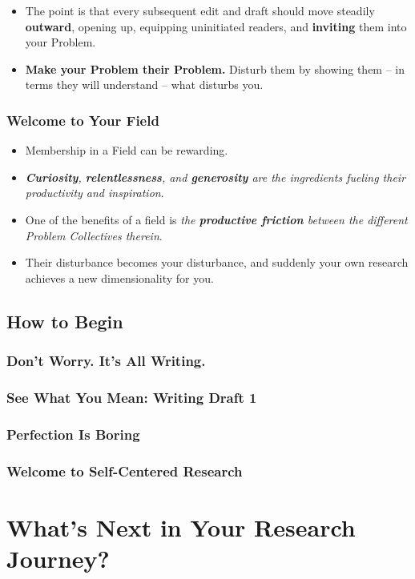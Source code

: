 \documentclass[11pt]{article}
\begin{document}
\begin{itemize}
\begin{exercise}
\begin{itemize}
\item  The point is that every subsequent edit and draft should move steadily \textbf{outward}, opening up, equipping uninitiated readers, and \textbf{inviting} them into your Problem. 

\item \textbf{Make your Problem their Problem.} Disturb them by showing them -- in terms they will understand -- what disturbs you. 
\end{itemize}

\end{exercise} 
\end{itemize}
\subsubsection{Welcome to Your Field}
\begin{itemize}
\item Membership in a Field can be rewarding. 

\item \emph{\textbf{Curiosity}, \textbf{relentlessness}, and \textbf{generosity} are the ingredients fueling their productivity and inspiration}. 

\item One of the benefits of a field is \emph{the \textbf{productive friction} between the different Problem Collectives therein}.

\item Their disturbance becomes your disturbance, and suddenly your own research achieves a new dimensionality for you.
\end{itemize}

\subsection{How to Begin}
\subsubsection{Don’t Worry. It’s All Writing.}
\subsubsection{See What You Mean: Writing Draft 1}
\subsubsection{Perfection Is Boring}
\subsubsection{Welcome to Self-Centered Research}

\section{What's Next in Your Research Journey?}


\newpage


\end{document}
